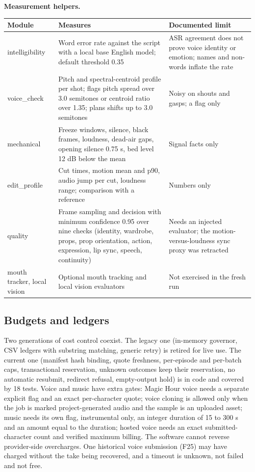 \documentclass[11pt,a4paper]{article}
\begin{document}
\textbf{Measurement helpers.}
\begin{longtable}{@{}P{3.0cm}P{6.3cm}P{6.2cm}@{}}
\toprule \textbf{Module} & \textbf{Measures} & \textbf{Documented limit}\\ \midrule\endhead
intelligibility & Word error rate against the script with a local base English model; default threshold 0.35 & ASR agreement does not prove voice identity or emotion; names and non-words inflate the rate\\
voice\_check & Pitch and spectral-centroid profile per shot; flags pitch spread over 3.0 semitones or centroid ratio over 1.35; plans shifts up to 3.0 semitones & Noisy on shouts and gasps; a flag only\\
mechanical & Freeze windows, silence, black frames, loudness, dead-air gaps, opening silence 0.75 s, bed level 12 dB below the mean & Signal facts only\\
edit\_profile & Cut times, motion mean and p90, audio jump per cut, loudness range; comparison with a reference & Numbers only\\
quality & Frame sampling and decision with minimum confidence 0.95 over nine checks (identity, wardrobe, props, prop orientation, action, expression, lip sync, speech, continuity) & Needs an injected evaluator; the motion-versus-loudness sync proxy was retracted\\
mouth tracker, local vision & Optional mouth tracking and local vision evaluators & Not exercised in the fresh run\\
\bottomrule
\end{longtable}

\subsection{Budgets and ledgers}
Two generations of cost control coexist. The legacy one (in-memory governor, CSV ledgers with substring matching, generic retry) is retired for live use. The current one (manifest hash binding, quote freshness, per-episode and per-batch caps, transactional reservation, unknown outcomes keep their reservation, no automatic resubmit, redirect refusal, empty-output hold) is in code and covered by 18 tests. Voice and music have extra gates: Magic Hour voice needs a separate explicit flag and an exact per-character quote; voice cloning is allowed only when the job is marked project-generated audio and the sample is an uploaded asset; music needs its own flag, instrumental only, an integer duration of 15 to 300 s and an amount equal to the duration; hosted voice needs an exact submitted-character count and verified maximum billing. The software cannot reverse provider-side overcharges. One historical voice submission (F25) may have charged without the take being recovered, and a timeout is unknown, not failed and not free.
\end{document}
